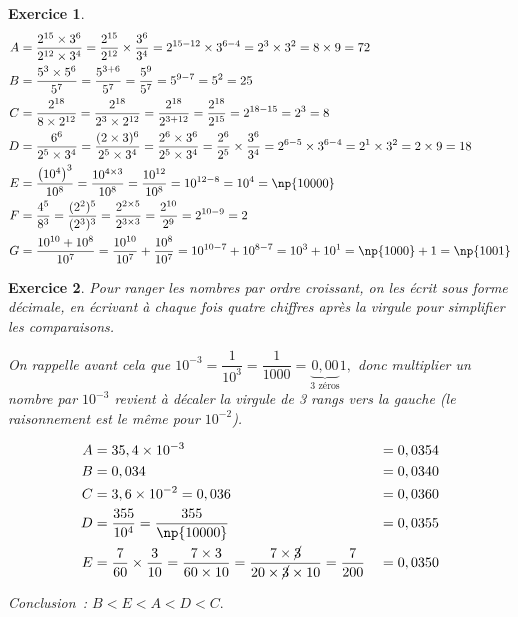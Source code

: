 \documentclass[10pt]{article}
\newtheorem{exo}{Exercice}
\begin{document}
\begin{exo}


\begin{align*}
A&=\frac{2^{15}\times 3^{6}}{2^{12}\times 3^4}=\frac{2^{15}}{2^{12}}\times \frac{ 3^{6}}{ 3^4}=2^{15-12}\times 3^{6-4}=2^3\times 3^2=8\times 9=72\\
B&=\frac{5^{3}\times 5^{6}}{5^7}=\frac{5^{3+6}}{5^7}=\frac{5^{9}}{5^7}=5^{9-7}=5^2=25\\
C&=\frac{2^{18}}{8\times 2^{12}}=\frac{2^{18}}{2^3\times 2^{12}}=\frac{2^{18}}{2^{3+12}}=\frac{2^{18}}{2^{15}}=2^{18-15}=2^3=8\\
D&=\frac{6^6}{2^5\times 3^4}=\frac{(2\times 3)^6}{2^5\times 3^4}=\frac{2^6\times 3^6}{2^5\times 3^4}=\frac{2^6}{2^5}\times \frac{3^6}{3^4}=2^{6-5}\times 3^{6-4}=2^1\times 3^2=2\times 9=18\\
E&=\frac{\left(10^4\right)^3}{10^8}=\frac{10^{4\times 3}}{10^8}=\frac{10^{12}}{10^8}=10^{12-8}=10^4=\np{10000}\\
 F&=\frac{4^5}{8^3}=\frac{(2^2)^5}{(2^3)^3}=\frac{2^{2\times 5}}{2^{3\times 3}}=\frac{2^{10}}{2^9}=2^{10-9}=2\\ 
 G&=\frac{10^{10}+10^8}{10^7}=\frac{10^{10}}{10^7}+\frac{10^8}{10^7}=10^{10-7}+10^{8-7}=10^3+10^1=\np{1000}+1=\np{1001}
 \end{align*}

\end{exo}


\begin{exo}%

Pour ranger les nombres par ordre croissant, on les écrit sous forme décimale, en écrivant à chaque fois quatre chiffres après la virgule pour simplifier les comparaisons.

On rappelle avant cela que $10^{-3}=\dfrac{1}{10^3}=\dfrac{1}{1000}=\underbrace{0,00}_{\text{3 zéros}}1,$ donc multiplier un nombre par $10^{-3}$ revient à décaler la virgule de 3 rangs vers la gauche (le raisonnement est le même pour $10^{-2}$).

\begin{align*}
A&=35,4\times 10^{-3}&&=0,0354\\
B&=0,034&&=0,0340\\
C&=3,6\times 10^{-2}=0,036&&=0,0360\\
D&=\frac{355}{10^4}=\frac{355}{\np{10000}}&&=0,0355\\
E&=\frac{7}{60}\times\frac{3}{10}=\frac{7\times 3}{60\times 10}=\frac{7\times \cancel{3}}{20\times\cancel{3}\times 10}=\frac{7}{200}&&=0,0350
\end{align*}

Conclusion~: $B<E<A<D<C.$
\end{exo}
\end{document}
